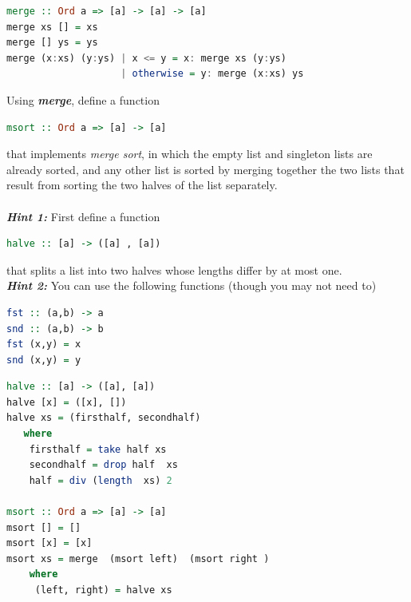 \documentclass{article}
\begin{document}
\begin{solution}
\begin{lstlisting}[language=Haskell]
merge :: Ord a => [a] -> [a] -> [a]
merge xs [] = xs
merge [] ys = ys
merge (x:xs) (y:ys) | x <= y = x: merge xs (y:ys)
                    | otherwise = y: merge (x:xs) ys
\end{lstlisting}
\end{solution}
\pagebreak
\begin{exercise}
Using \textbf{\textit{merge}}, define a function 
\begin{lstlisting}[language=Haskell]
msort :: Ord a => [a] -> [a] 
\end{lstlisting}
that implements \textit{merge sort}, in which the empty list and singleton lists are already sorted, and any other list is sorted by merging together the two lists that result from sorting the two halves of the list separately.\\ \\
\textbf{\textit{Hint 1:}} First define a function 
\begin{lstlisting}[language=Haskell]
halve :: [a] -> ([a] , [a])
\end{lstlisting}
that splits a list into two halves whose lengths differ by at most one. \\
\textbf{\textit{Hint 2:}} You can use the following functions (though you may not need to) 
\begin{lstlisting}[language=Haskell]
fst :: (a,b) -> a
snd :: (a,b) -> b
fst (x,y) = x
snd (x,y) = y
\end{lstlisting}
\end{exercise}

\begin{solution}
\begin{lstlisting}[language=Haskell]
halve :: [a] -> ([a], [a]) 
halve [x] = ([x], [])
halve xs = (firsthalf, secondhalf)
   where 
    firsthalf = take half xs
    secondhalf = drop half  xs
    half = div (length  xs) 2

msort :: Ord a => [a] -> [a]    
msort [] = [] 
msort [x] = [x]
msort xs = merge  (msort left)  (msort right )
    where 
     (left, right) = halve xs
\end{lstlisting}
\end{solution}
\end{document}

